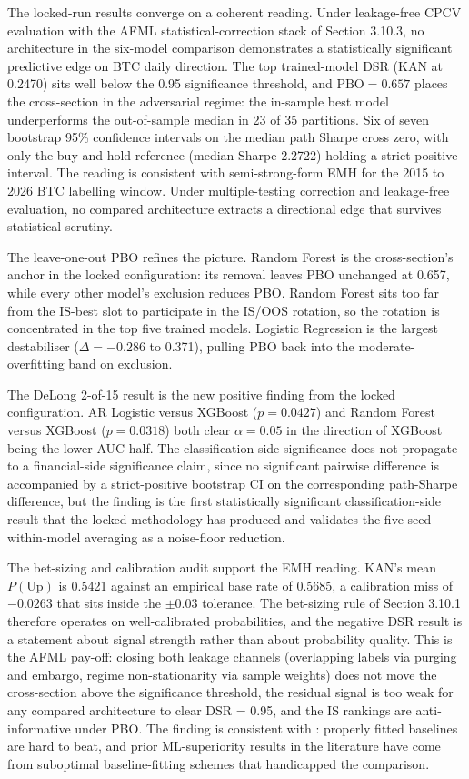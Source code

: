 \documentclass[12pt,a4paper,oneside]{article}
\begin{document}
The locked-run results converge on a coherent reading. Under leakage-free CPCV evaluation with the AFML statistical-correction stack of Section 3.10.3, no architecture in the six-model comparison demonstrates a statistically significant predictive edge on BTC daily direction. The top trained-model DSR (KAN at 0.2470) sits well below the 0.95 significance threshold, and $\text{PBO} = 0.657$ places the cross-section in the adversarial regime: the in-sample best model underperforms the out-of-sample median in 23 of 35 partitions. Six of seven bootstrap 95\% confidence intervals on the median path Sharpe cross zero, with only the buy-and-hold reference (median Sharpe 2.2722) holding a strict-positive interval. The reading is consistent with semi-strong-form EMH \citep{fama_1970} for the 2015 to 2026 BTC labelling window. Under multiple-testing correction and leakage-free evaluation, no compared architecture extracts a directional edge that survives statistical scrutiny.

The leave-one-out PBO refines the picture. Random Forest is the cross-section's anchor in the locked configuration: its removal leaves PBO unchanged at 0.657, while every other model's exclusion reduces PBO. Random Forest sits too far from the IS-best slot to participate in the IS/OOS rotation, so the rotation is concentrated in the top five trained models. Logistic Regression is the largest destabiliser ($\Delta = -0.286$ to 0.371), pulling PBO back into the moderate-overfitting band on exclusion.

The DeLong 2-of-15 result is the new positive finding from the locked configuration. AR Logistic versus XGBoost ($p = 0.0427$) and Random Forest versus XGBoost ($p = 0.0318$) both clear $\alpha = 0.05$ in the direction of XGBoost being the lower-AUC half. The classification-side significance does not propagate to a financial-side significance claim, since no significant pairwise difference is accompanied by a strict-positive bootstrap CI on the corresponding path-Sharpe difference, but the finding is the first statistically significant classification-side result that the locked methodology has produced and validates the five-seed within-model averaging as a noise-floor reduction.

The bet-sizing and calibration audit support the EMH reading. KAN's mean $P(\text{Up})$ is 0.5421 against an empirical base rate of 0.5685, a calibration miss of $-0.0263$ that sits inside the $\pm 0.03$ tolerance. The bet-sizing rule of Section 3.10.1 therefore operates on well-calibrated probabilities, and the negative DSR result is a statement about signal strength rather than about probability quality. This is the AFML pay-off: closing both leakage channels (overlapping labels via purging and embargo, regime non-stationarity via sample weights) does not move the cross-section above the significance threshold, the residual signal is too weak for any compared architecture to clear DSR = 0.95, and the IS rankings are anti-informative under PBO. The finding is consistent with \citet{chassot_audrino_2026}: properly fitted baselines are hard to beat, and prior ML-superiority results in the literature have come from suboptimal baseline-fitting schemes that handicapped the comparison.
\end{document}
